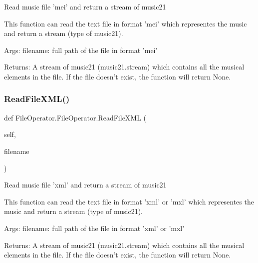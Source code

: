 \begin{DoxyVerb}Read music file 'mei' and return a stream of music21

This function can read the text file in format 'mei' which representes
the music and return a stream (type of music21).

Args:
    filename: full path of the file in format 'mei'

Returns:
    A stream of music21 (music21.stream) which contains all the musical
    elements in the file. If the file doesn't exist, the function will
    return None.
\end{DoxyVerb}
 \mbox{\label{class_file_operator_1_1_file_operator_a9b2a851469c6c2398bdf94e0298a76ad}} 
\subsubsection{\texorpdfstring{Read\+File\+X\+M\+L()}{ReadFileXML()}}
{\footnotesize\ttfamily def File\+Operator.\+File\+Operator.\+Read\+File\+X\+ML (\begin{DoxyParamCaption}\item[{}]{self,  }\item[{}]{filename }\end{DoxyParamCaption})}

\begin{DoxyVerb}Read music file 'xml' and return a stream of music21

This function can read the text file in format 'xml' or 'mxl' which
representes the music and return a stream (type of music21).

Args:
    filename: full path of the file in format 'xml' or 'mxl'

Returns:
    A stream of music21 (music21.stream) which contains all the musical
    elements in the file. If the file doesn't exist, the function will
    return None.
\end{DoxyVerb}
 \mbox{\label{class_file_operator_1_1_file_operator_a7dbbfd470da774ca20346a568bf88a66}} 
